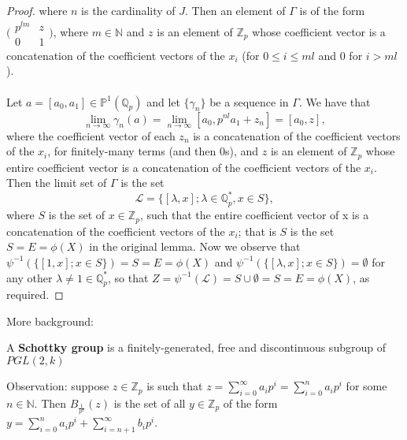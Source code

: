 \begin{proof}
	where $n$ is the cardinality of $J$. Then an element of $\Gamma$ is of the form
	$\bigl( \begin{smallmatrix}p^{lm} & z\\ 0 & 1 \end{smallmatrix}\bigr)$, where $m \in \mathbb{N}$ and $z$ is an element of $\mathbb{Z}_p$ whose coefficient vector is a concatenation of the coefficient vectors of the $x_i$ (for $0 \leq i \leq ml$ and $0$ for $i > ml$). \\\\
	 Let $a=[a_0,a_1] \in \mathbb{P}^1(\mathbb{Q}_p)$ and let $\{\gamma_n\}$ be a sequence in $\Gamma$. We have that $$\lim_{n\to\infty} \gamma_n(a) = \lim_{n\to\infty} [a_0, p^{nl}a_1 + z_n] = [a_0, z],$$ where the coefficient vector of each $z_n$ is a concatenation of the coefficient vectors of the $x_i$, for finitely-many terms (and then $0$s), and $z$ is an element of $\mathbb{Z}_p$ whose entire coefficient vector is a concatenation of the coefficient vectors of the $x_i$.  Then the limit set of $\Gamma$ is the set \[\mathcal{L}=\{[\lambda, x]; \lambda \in \mathbb{Q}_p^*, x \in S\},\] where $S$ is the set of $x \in \mathbb{Z}_p$, such that the entire coefficient vector of x is a concatenation of the coefficient vectors of the $x_i$; that is $S$ is the set  $S=E=\phi(X)$ in the original lemma. Now we observe that $\psi^{-1}(\{[1, x]; x \in S\}) = S= E=\phi(X)$ and $\psi^{-1}(\{[\lambda, x]; x \in S\}) = \emptyset$ for any other $\lambda \neq 1 \in \mathbb{Q}_p^*$, so that $Z=\psi^{-1}(\mathcal{L})=S \cup \emptyset = S =E=\phi(X)$, as required. 
	 

\end{proof}
 
 
More background: 

\begin{definition*} \cite{gvdp} A \textbf{Schottky group} is a finitely-generated, free and discontinuous subgroup of  $PGL(2,k)$
\end{definition*}

Observation: suppose $z \in \mathbb{Z}_p$ is such that $z = \sum_{i=0}^\infty a_ip^i = \sum_{i=0}^n a_ip^i$ for some $n \in \mathbb{N}$. Then $B_{\frac{1}{p^n}}(z)$ is the set of all $y \in \mathbb{Z}_p$ of the form $y=\sum_{i=0}^n a_ip^i + \sum_{i=n+1}^\infty b_ip^i$.

